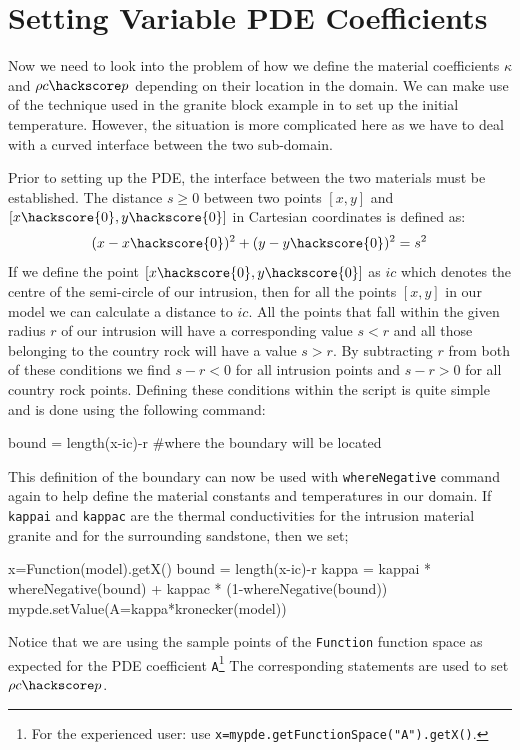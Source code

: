\section{Setting Variable PDE Coefficients}
Now we need to look into the problem of how we define the material coefficients
$\kappa$ and $\rho c\hackscore p$ depending on their location in the domain. 
We can make use of the technique used in the granite block example in
to set up the initial temperature. However,
the situation is more complicated here as we have to deal with a
curved interface between the two sub-domain.

Prior to setting up the PDE, the interface between the two materials must be
established. 
The distance $s\ge 0$ between two points $[x,y]$ and
$[x\hackscore{0},y\hackscore{0}]$ in Cartesian coordinates is defined as:
\begin{equation}
 (x-x\hackscore{0})^{2}+(y-y\hackscore{0})^{2} = s^{2}
\end{equation}
If we define the point $[x\hackscore{0},y\hackscore{0}]$ as $ic$ which denotes
the centre of the semi-circle of our intrusion, then for all the points $[x,y]$
in our model we can calculate a distance to $ic$. 
All the points that fall within the given radius $r$ of our intrusion will have
a corresponding 
value $s < r$ and all those belonging to the country rock will have a value $s >
r$. By subtracting $r$ from both of these conditions we find $s-r < 0$ for all
intrusion points and $s-r > 0$ 
for all country rock points. 
Defining these conditions within the script is quite simple and is done using
the following command:
\begin{python}
 bound = length(x-ic)-r #where the boundary will be located
\end{python}
This definition of the boundary can now be used with \verb|whereNegative|
command again to help define the material constants and temperatures in our
domain. 
If \verb|kappai| and \verb|kappac| are the 
thermal conductivities for the intrusion material granite and for the
surrounding sandstone, then we set; 
\begin{python}
x=Function(model).getX()
bound = length(x-ic)-r
kappa = kappai * whereNegative(bound) + kappac * (1-whereNegative(bound))
mypde.setValue(A=kappa*kronecker(model))
\end{python}
Notice that we are using the sample points of the \verb|Function| function space
as expected for the 
PDE coefficient \verb|A|\footnote{For the experienced user: use
\texttt{x=mypde.getFunctionSpace("A").getX()}.}
The corresponding statements are used to set $\rho c\hackscore p$. 

